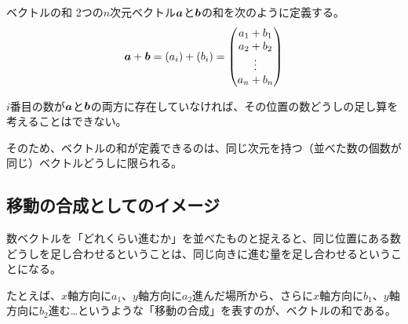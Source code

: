 \documentclass[../../../topic_linear-algebra]{subfiles}
\begin{document}
\begin{definition*}{ベクトルの和}
  2つの$n$次元ベクトル$\vb*{a}$と$\vb*{b}$の和を次のように定義する。
  \begin{equation*}
    \vb*{a} + \vb*{b} = (a_i) + (b_i) = \begin{pmatrix} a_1 + b_1 \\ a_2 + b_2 \\ \vdots \\ a_n + b_n \end{pmatrix}
  \end{equation*}
\end{definition*}

$i$番目の数が$\vb*{a}$と$\vb*{b}$の両方に存在していなければ、その位置の数どうしの足し算を考えることはできない。

そのため、ベクトルの和が定義できるのは、同じ次元を持つ（並べた数の個数が同じ）ベクトルどうしに限られる。

\subsection{移動の合成としてのイメージ}

数ベクトルを「どれくらい進むか」を並べたものと捉えると、同じ位置にある数どうしを足し合わせるということは、同じ向きに進む量を足し合わせるということになる。

たとえば、$x$軸方向に$a_1$、$y$軸方向に$a_2$進んだ場所から、さらに$x$軸方向に$b_1$、$y$軸方向に$b_2$進む…というような「移動の合成」を表すのが、ベクトルの和である。
\end{document}
